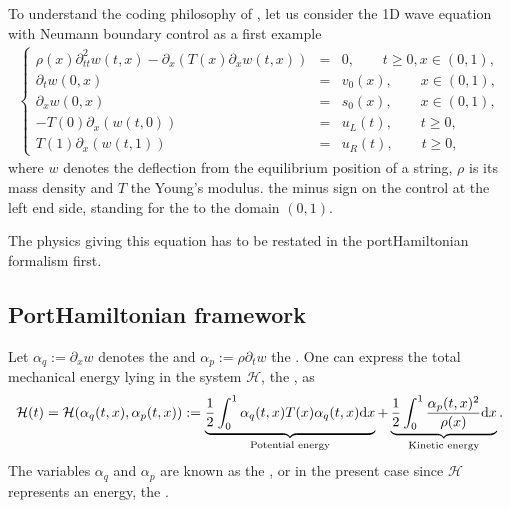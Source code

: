 \documentclass[letterpaper,10pt,english]{sphinxmanual}
\begin{document}
\sphinxAtStartPar
To understand the coding philosophy of , let us consider the 1D wave equation with Neumann boundary control as a first example
\begin{equation*}
\begin{split}\left\lbrace
\begin{array}{rcl}
\rho(x) \partial_{tt}^2 w(t,x) - \partial_x \left( T(x) \partial_x w(t,x) \right) &=& 0, \qquad t \ge 0, x \in (0,1), \\
\partial_t w(0,x) &=& v_0(x), \qquad x \in (0,1), \\
\partial_x w(0,x) &=& s_0(x), \qquad x \in (0,1), \\
- T(0) \partial_x \left( w(t,0) \right) &=& u_L(t), \qquad t \ge 0, \\
T(1) \partial_x \left( w(t,1) \right) &=& u_R(t), \qquad t \ge 0,
\end{array}
\right.\end{split}
\end{equation*}
\sphinxAtStartPar
where \(w\) denotes the deflection from the equilibrium position of
a string, \(\rho\) is its mass density and \(T\) the Young’s
modulus.  the minus sign on the control at the left end side,
standing for the  to the domain \((0,1)\).

\sphinxAtStartPar
The physics giving this equation has to be restated in the
port\sphinxhyphen{}Hamiltonian formalism first.


\subsection{Port\sphinxhyphen{}Hamiltonian framework}
\label{\detokenize{started:port-hamiltonian-framework}}
\sphinxAtStartPar
Let \(\alpha_q := \partial_x w\) denotes the  and
\(\alpha_p := \rho \partial_t w\) the . One can
express the total mechanical energy lying in the system
\(\mathcal{H}\), the , as
\begin{equation*}
\begin{split}\mathcal{H}(t) = \mathcal{H}(\alpha_q(t,x), \alpha_p(t,x)) := \underbrace{\frac{1}{2} \int_0^1 \alpha_q(t,x) T(x) \alpha_q(t,x) {\rm d}x}_{\text{Potential energy}} + \underbrace{\frac{1}{2} \int_0^1 \frac{\alpha_p(t,x)^2}{\rho(x)} {\rm d}x}_{\text{Kinetic energy}}.\end{split}
\end{equation*}
\sphinxAtStartPar
The variables \(\alpha_q\) and \(\alpha_p\) are known as the
, or in the present case since \(\mathcal{H}\)
represents an energy, the .
\end{document}
